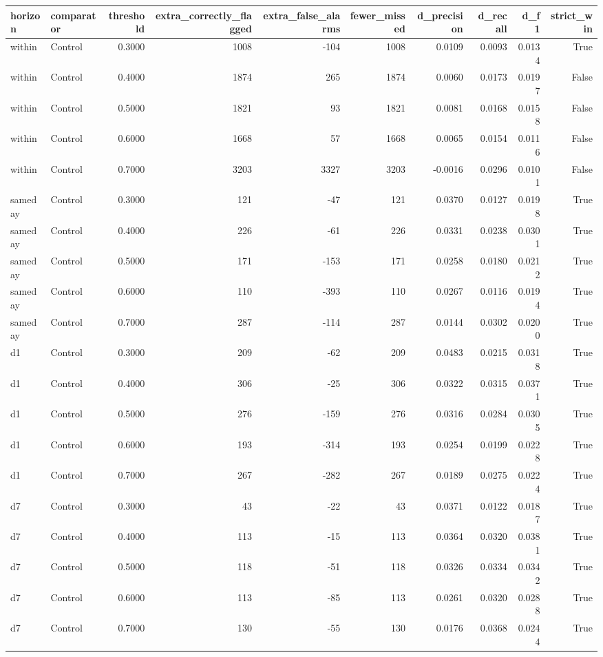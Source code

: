\begin{tabular}{llrrrrrrrr}
\toprule
horizon & comparator & threshold & extra\_correctly\_flagged & extra\_false\_alarms & fewer\_missed & d\_precision & d\_recall & d\_f1 & strict\_win \\
\midrule
within & Control & 0.3000 & 1008 & -104 & 1008 & 0.0109 & 0.0093 & 0.0134 & True \\
within & Control & 0.4000 & 1874 & 265 & 1874 & 0.0060 & 0.0173 & 0.0197 & False \\
within & Control & 0.5000 & 1821 & 93 & 1821 & 0.0081 & 0.0168 & 0.0158 & False \\
within & Control & 0.6000 & 1668 & 57 & 1668 & 0.0065 & 0.0154 & 0.0116 & False \\
within & Control & 0.7000 & 3203 & 3327 & 3203 & -0.0016 & 0.0296 & 0.0101 & False \\
sameday & Control & 0.3000 & 121 & -47 & 121 & 0.0370 & 0.0127 & 0.0198 & True \\
sameday & Control & 0.4000 & 226 & -61 & 226 & 0.0331 & 0.0238 & 0.0301 & True \\
sameday & Control & 0.5000 & 171 & -153 & 171 & 0.0258 & 0.0180 & 0.0212 & True \\
sameday & Control & 0.6000 & 110 & -393 & 110 & 0.0267 & 0.0116 & 0.0194 & True \\
sameday & Control & 0.7000 & 287 & -114 & 287 & 0.0144 & 0.0302 & 0.0200 & True \\
d1 & Control & 0.3000 & 209 & -62 & 209 & 0.0483 & 0.0215 & 0.0318 & True \\
d1 & Control & 0.4000 & 306 & -25 & 306 & 0.0322 & 0.0315 & 0.0371 & True \\
d1 & Control & 0.5000 & 276 & -159 & 276 & 0.0316 & 0.0284 & 0.0305 & True \\
d1 & Control & 0.6000 & 193 & -314 & 193 & 0.0254 & 0.0199 & 0.0228 & True \\
d1 & Control & 0.7000 & 267 & -282 & 267 & 0.0189 & 0.0275 & 0.0224 & True \\
d7 & Control & 0.3000 & 43 & -22 & 43 & 0.0371 & 0.0122 & 0.0187 & True \\
d7 & Control & 0.4000 & 113 & -15 & 113 & 0.0364 & 0.0320 & 0.0381 & True \\
d7 & Control & 0.5000 & 118 & -51 & 118 & 0.0326 & 0.0334 & 0.0342 & True \\
d7 & Control & 0.6000 & 113 & -85 & 113 & 0.0261 & 0.0320 & 0.0288 & True \\
d7 & Control & 0.7000 & 130 & -55 & 130 & 0.0176 & 0.0368 & 0.0244 & True \\

\end{tabular}
